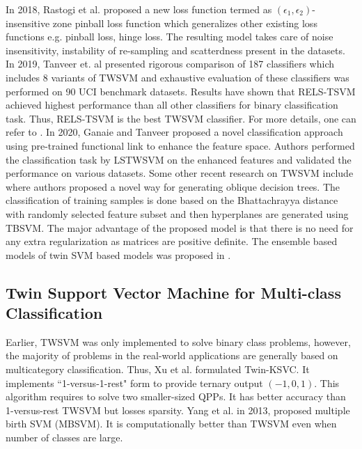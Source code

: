 \documentclass[pdflatex,sn-mathphys]{sn-jnl}%
\theoremstyle{thmstyleone}%
\theoremstyle{thmstyletwo}%
\theoremstyle{thmstylethree}%
\begin{document}
In 2018, Rastogi et al. \cite{rastogi2018generalized} proposed a new loss function termed as $(\epsilon_1, \epsilon_2)$-insensitive zone pinball loss function which generalizes other existing loss functions e.g. pinball loss, hinge loss. The resulting model takes care of noise insensitivity, instability of re-sampling and scatterdness present in the datasets. In 2019, Tanveer et. al \cite{tanveer2019comprehensive} presented rigorous comparison of 187 classifiers which includes 8 variants of TWSVM and exhaustive evaluation of these classifiers was performed on 90 UCI benchmark datasets. Results have shown that RELS-TSVM achieved highest performance than all other classifiers for binary classification task. Thus,  RELS-TSVM is the best TWSVM classifier. For more details, one can refer to \cite{tanveer2019comprehensive}. In 2020, Ganaie and Tanveer \cite{ganaie2020lstsvm} proposed a novel classification approach using pre-trained functional link to enhance the feature space. Authors performed the classification task by LSTWSVM on the enhanced features and validated the performance on various datasets. Some other recent research on TWSVM include \cite{ganaie2020oblique} where authors proposed a novel way for generating oblique decision trees. The classification of training samples is done based on the Bhattachrayya distance with randomly selected feature subset and then hyperplanes are generated using TBSVM. The major advantage of the proposed model is that there is no need for any extra regularization as matrices are positive definite. The ensemble \cite{ganaie2021ensemble} based models of twin SVM based models was proposed in \cite{tanveer2021ensemble}.

\subsection{Twin Support Vector Machine for Multi-class Classification}

Earlier, TWSVM was only implemented to solve binary class problems, however, the majority of problems in the real-world applications are generally based on multicategory classification. Thus, Xu et al. \cite{xu2013twin} formulated Twin-KSVC. It implements ``1-versus-1-rest" form to provide ternary output $(-1, 0, 1)$. This algorithm requires to solve two smaller-sized QPPs. It has better accuracy than 1-versus-rest TWSVM but losses sparsity. Yang et al. \cite{yang2013multiple} in 2013, proposed multiple birth SVM (MBSVM). It is computationally better than TWSVM even when number of classes are large.
\end{document}
